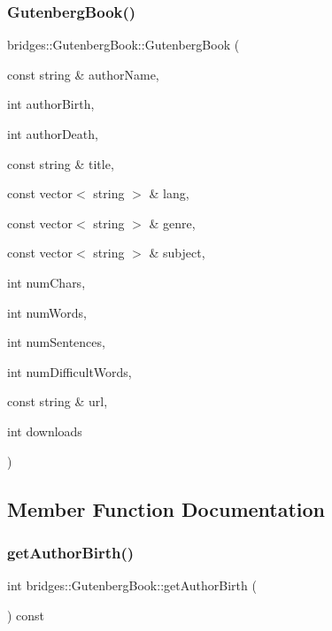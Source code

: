 \subsubsection{\texorpdfstring{Gutenberg\+Book()}{GutenbergBook()}\hspace{0.1cm}{\footnotesize\ttfamily [2/2]}}
{\footnotesize\ttfamily bridges\+::\+Gutenberg\+Book\+::\+Gutenberg\+Book (\begin{DoxyParamCaption}\item[{const string \&}]{author\+Name,  }\item[{int}]{author\+Birth,  }\item[{int}]{author\+Death,  }\item[{const string \&}]{title,  }\item[{const vector$<$ string $>$ \&}]{lang,  }\item[{const vector$<$ string $>$ \&}]{genre,  }\item[{const vector$<$ string $>$ \&}]{subject,  }\item[{int}]{num\+Chars,  }\item[{int}]{num\+Words,  }\item[{int}]{num\+Sentences,  }\item[{int}]{num\+Difficult\+Words,  }\item[{const string \&}]{url,  }\item[{int}]{downloads }\end{DoxyParamCaption})\hspace{0.3cm}{\ttfamily [inline]}}



\subsection{Member Function Documentation}
\mbox{\label{classbridges_1_1_gutenberg_book_a044cf5c0a7d96c2f9f529889feab2b14}} 
\subsubsection{\texorpdfstring{get\+Author\+Birth()}{getAuthorBirth()}}
{\footnotesize\ttfamily int bridges\+::\+Gutenberg\+Book\+::get\+Author\+Birth (\begin{DoxyParamCaption}{ }\end{DoxyParamCaption}) const\hspace{0.3cm}{\ttfamily [inline]}}

